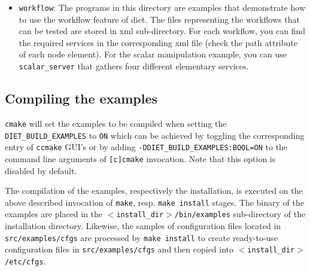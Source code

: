 \begin{itemize}
\item{\texttt{workflow}}: The programs in this directory are examples that
  demonstrate how to use the workflow feature of diet.  The files representing
  the workflows that can be tested are stored in xml sub-directory. For each
  workflow, you can find the required services in the corresponding xml file
  (check the path attribute of each node element).  For the scalar manipulation
  example, you can use \texttt{scalar\_server} that gathers four different
  elementary services.
\end{itemize}


\subsection{Compiling the examples}
\label{subsection:compiling-examples}

\verb+cmake+ will set the examples to be compiled when setting the
\verb+DIET_BUILD_EXAMPLES+ to \verb+ON+ which can be achieved by
toggling the corresponding entry of \verb+ccmake+ GUI's or by adding
\verb+-DDIET_BUILD_EXAMPLES:BOOL=ON+ to the command line arguments of
\verb+[c]cmake+ invocation. Note that this option is disabled by
default.

The compilation of the examples, respectively the installation, is executed on
the above described invocation of \verb+make+, resp. \verb+make install+
stages. The binary of the examples are placed in the
\texttt{$<$install\_dir$>$/bin/examples} sub-directory of the installation
directory. Likewise, the samples of configuration files located in
\texttt{src/examples/cfgs} are processed by \texttt{make install} to create
ready-to-use configuration files in \texttt{src/examples/cfgs} and then copied
into \texttt{$<$install\_dir$>$/etc/cfgs}.


